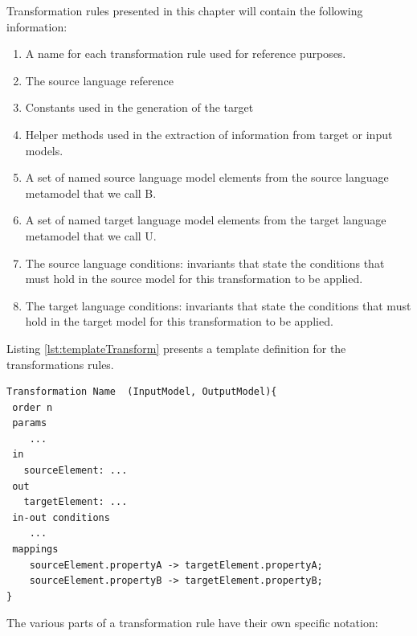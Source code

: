 Transformation rules presented in this chapter will contain the following information:

\begin{enumerate}

\item A name for each transformation rule used for reference purposes.

\item The source language reference

\item Constants used in the generation of the target

\item Helper methods used in the extraction of information from target or input models.

\item A set of named source language model elements from the source language metamodel that we call B.

\item A set of named target language model elements from the target language metamodel that we call U.

\item The source language conditions: invariants that state the conditions that must hold in the source model for this transformation to be applied.

\item The target language conditions: invariants that state the conditions that must hold in the target model for this transformation to be applied.

\end{enumerate}


Listing \ref{lst:templateTransform} presents a template definition for the transformations rules.

\begin{lstlisting}[style=mine,caption=Template definition for Transformation rules,label=lst:templateTransform]
Transformation Name  (InputModel, OutputModel){
 order n
 params
 	...
 in
   sourceElement: ...
 out
   targetElement: ...
 in-out conditions
 	...
 mappings
    sourceElement.propertyA -> targetElement.propertyA;
    sourceElement.propertyB -> targetElement.propertyB;
}
\end{lstlisting}

The various parts of a transformation rule have their own  specific notation:

